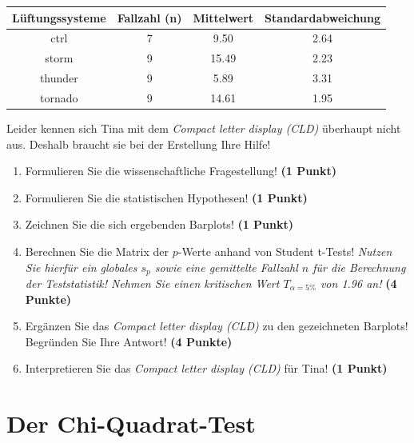 \documentclass[a4paper, 9pt]{scrartcl}\usepackage[]{graphicx}\usepackage[]{xcolor}
\newenvironment{knitrout}{}{} %
\begin{document}
\begin{knitrout}
\color{fgcolor}\begin{table}[!h]
\centering\begingroup\fontsize{10}{12}\selectfont

\begin{tabular}{cccc}
\toprule
\textbf{Lüftungssysteme} & \textbf{Fallzahl (n)} & \textbf{Mittelwert} & \textbf{Standardabweichung}\\
\midrule
ctrl & 7 & 9.50 & 2.64\\
storm & 9 & 15.49 & 2.23\\
thunder & 9 & 5.89 & 3.31\\
tornado & 9 & 14.61 & 1.95\\
\bottomrule
\end{tabular}
\endgroup{}
\end{table}

\end{knitrout}

Leider kennen sich Tina mit dem \textit{Compact letter display (CLD)} überhaupt nicht aus. Deshalb braucht sie bei der Erstellung Ihre Hilfe!

\begin{enumerate}
  \item Formulieren Sie die wissenschaftliche Fragestellung! \textbf{(1 Punkt)}
  \item Formulieren Sie die statistischen Hypothesen! \textbf{(1 Punkt)}
\item Zeichnen Sie die sich ergebenden Barplots! \textbf{(1 Punkt)}
\item Berechnen Sie die Matrix der $p$-Werte anhand von Student t-Tests! \textit{Nutzen Sie hierfür ein globales $s_p$ sowie eine gemittelte Fallzahl $n$ für die Berechnung der Teststatistik! Nehmen Sie einen kritischen Wert $T_{\alpha = 5\%}$ von 1.96 an!} \textbf{(4 Punkte)}
\item Ergänzen Sie das \textit{Compact letter display (CLD)} zu den gezeichneten Barplots! Begründen Sie Ihre Antwort! \textbf{(4 Punkte)}
\item Interpretieren Sie das \textit{Compact letter display (CLD)} für Tina! \textbf{(1 Punkt)} 
\end{enumerate}

 
\clearpage
\part{Der Chi-Quadrat-Test}
\end{document}
